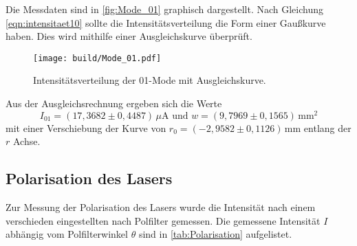 Die Messdaten sind in \autoref{fig:Mode_01} graphisch dargestellt. Nach Gleichung \ref{eqn:intensitaet10} sollte die Intensitätsverteilung die Form einer Gaußkurve haben. Dies wird mithilfe einer Ausgleichskurve überprüft. 

\begin{figure}[h]
    \centering
    \texttt{[image: build/Mode\_01.pdf]}
    \caption{Intensitätsverteilung der 01-Mode mit Ausgleichskurve.}
    \label{fig:Mode_01}
\end{figure}
Aus der Ausgleichsrechnung ergeben sich die Werte 
\begin{equation*}
    I_{01} = (17{,}3682 \pm 0{,}4487) \, \unit{\mu\ampere} \,\, \text{und} \,\, w = (9{,}7969 \pm 0{,}1565) \, \unit{\milli\meter\squared}
\end{equation*}
mit einer Verschiebung der Kurve von $r_0 = (-2{,}9582 \pm 0{,}1126)\, \unit{\milli\meter}$ entlang der $r$ Achse.
\FloatBarrier 

\subsection{Polarisation des Lasers}
Zur Messung der Polarisation des Lasers wurde die Intensität nach einem verschieden eingestellten nach Polfilter gemessen. Die gemessene Intensität $I$ abhängig vom Polfilterwinkel $\theta$ sind in \autoref{tab:Polarisation} aufgelistet. 

